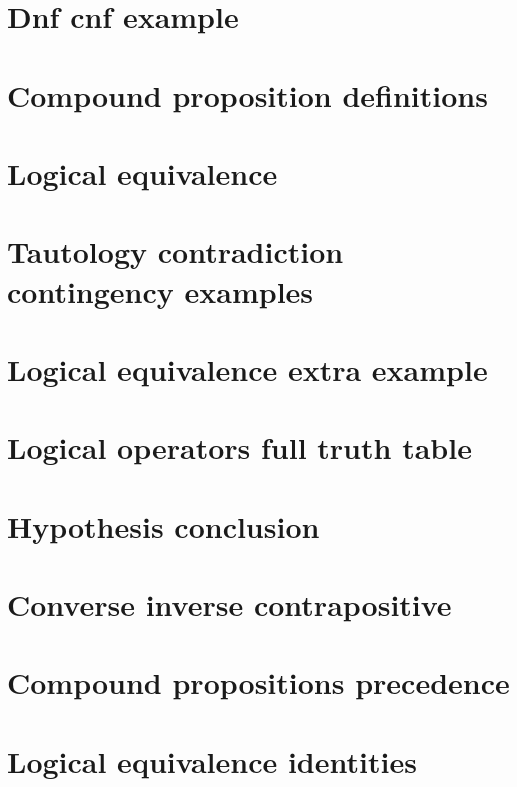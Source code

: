 \section*{Dnf cnf example}

\vfill
\section*{Compound proposition definitions}

\vfill
\section*{Logical equivalence}

\vfill
\section*{Tautology contradiction contingency examples}

\vfill
\section*{Logical equivalence extra example}

\vfill
\section*{Logical operators full truth table}

\vfill
\section*{Hypothesis conclusion}

\vfill
\section*{Converse inverse contrapositive}

\vfill
\section*{Compound propositions precedence}

\vfill
\section*{Logical equivalence identities}

\vfill
